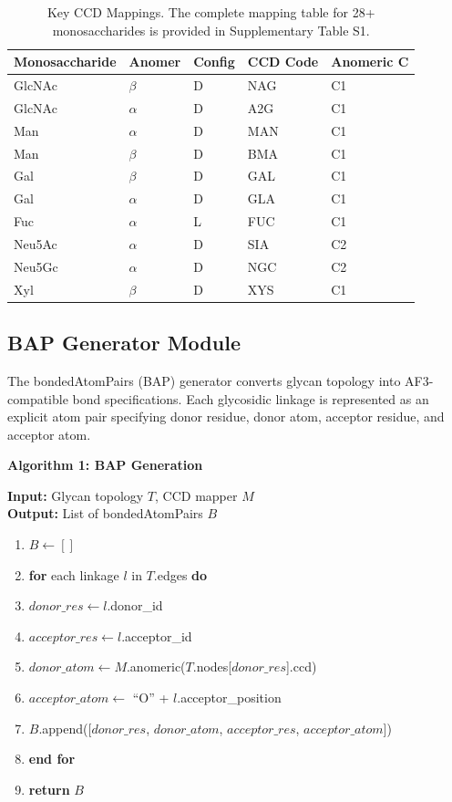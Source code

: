 \documentclass[11pt,a4paper]{article}
\begin{document}
{\begin{table}[h]
\centering
\caption{Key CCD Mappings. The complete mapping table for 28+ monosaccharides is provided in Supplementary Table S1.}
\begin{tabular}{lllll}
\toprule
Monosaccharide & Anomer & Config & CCD Code & Anomeric C \\
\midrule
GlcNAc & $\beta$ & D & NAG & C1 \\
GlcNAc & $\alpha$ & D & A2G & C1 \\
Man & $\alpha$ & D & MAN & C1 \\
Man & $\beta$ & D & BMA & C1 \\
Gal & $\beta$ & D & GAL & C1 \\
Gal & $\alpha$ & D & GLA & C1 \\
Fuc & $\alpha$ & L & FUC & C1 \\
Neu5Ac & $\alpha$ & D & SIA & C2 \\
Neu5Gc & $\alpha$ & D & NGC & C2 \\
Xyl & $\beta$ & D & XYS & C1 \\
\bottomrule
\end{tabular}
\label{tab:ccd_mapping}
\end{table}

\subsection{BAP Generator Module}

The bondedAtomPairs (BAP) generator converts glycan topology into AF3-compatible bond specifications. Each glycosidic linkage is represented as an explicit atom pair specifying donor residue, donor atom, acceptor residue, and acceptor atom.

\textbf{Algorithm 1: BAP Generation}

\noindent\textbf{Input:} Glycan topology $T$, CCD mapper $M$\\
\textbf{Output:} List of bondedAtomPairs $B$

\begin{enumerate}
\item $B \gets []$
\item \textbf{for} each linkage $l$ in $T$.edges \textbf{do}
\item \quad $donor\_res \gets l$.donor\_id
\item \quad $acceptor\_res \gets l$.acceptor\_id
\item \quad $donor\_atom \gets M$.anomeric($T$.nodes[$donor\_res$].ccd)
\item \quad $acceptor\_atom \gets$ ``O'' + $l$.acceptor\_position
\item \quad $B$.append([$donor\_res$, $donor\_atom$, $acceptor\_res$, $acceptor\_atom$])
\item \textbf{end for}
\item \textbf{return} $B$
\end{enumerate}

}
\end{document}
